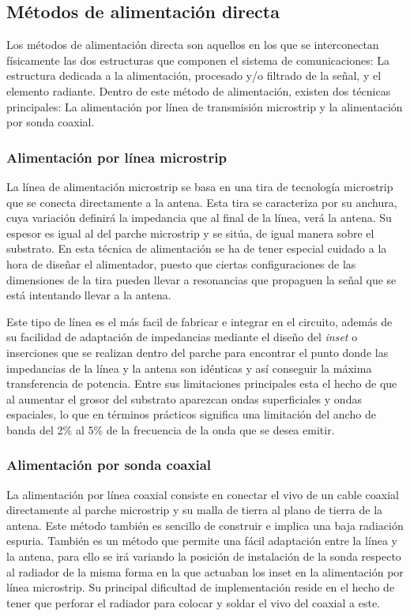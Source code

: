 \subsection{Métodos de alimentación directa}
\par Los métodos de alimentación directa son aquellos en los que se interconectan físicamente las dos estructuras que componen el sistema de comunicaciones: La estructura dedicada a la alimentación, procesado y/o filtrado de la señal, y el elemento radiante. Dentro de este método de alimentación, existen dos técnicas principales: La alimentación por línea de transmisión microstrip y la alimentación por sonda coaxial.

\subsubsection{Alimentación por línea microstrip}
\par La línea de alimentación microstrip se basa en una tira de tecnología microstrip que se conecta directamente a la antena. Esta tira se caracteriza por su anchura, cuya variación definirá la impedancia que al final de la línea, verá la antena. Su espesor es igual al del parche microstrip y se sitúa, de igual manera sobre el substrato. En esta técnica de alimentación se ha de tener especial cuidado a la hora de diseñar el alimentador, puesto que ciertas configuraciones de las dimensiones de la tira pueden llevar a resonancias que propaguen la señal que se está intentando llevar a la antena. 
\\
\par Este tipo de línea es el más facil de fabricar e integrar en el circuito, además de su facilidad de adaptación de impedancias mediante el diseño del \textit{inset} o inserciones que se realizan dentro del parche para encontrar el punto donde las impedancias de la línea y la antena son idénticas y así conseguir la máxima transferencia de potencia. Entre sus limitaciones principales esta el hecho de que al aumentar el grosor del substrato aparezcan ondas superficiales y ondas espaciales, lo que en términos prácticos significa una limitación del ancho de banda del 2\% al 5\% de la frecuencia de la onda que se desea emitir.

\subsubsection{Alimentación por sonda coaxial}
\par La alimentación por línea coaxial consiste en conectar el vivo de un cable coaxial directamente al parche microstrip y su malla de tierra al plano de tierra de la antena. Este método también es sencillo de construir e implica una baja radiación espuria. También es un método que permite una fácil adaptación entre la línea y la antena, para ello se irá variando la posición de instalación de la sonda respecto al radiador de la misma forma en la que actuaban los inset en la alimentación por línea microstrip. Su principal dificultad de implementación reside en el hecho de tener que perforar el radiador para colocar y soldar el vivo del coaxial a este.

